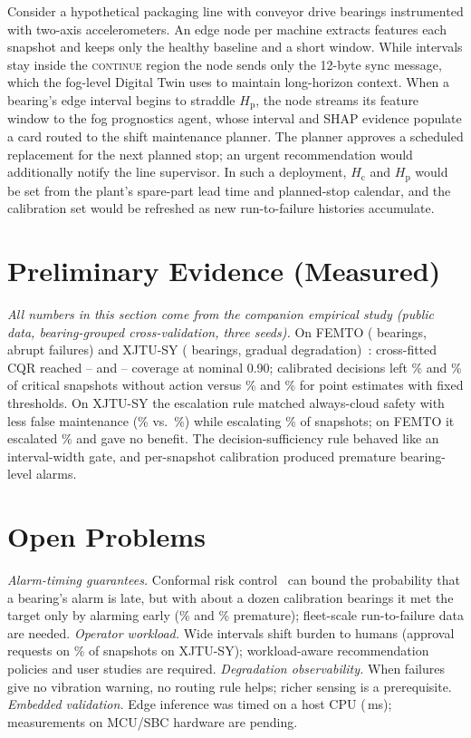 \documentclass[conference]{IEEEtran}
\newcommand{\Hc}{H_{\mathrm{c}}}
\newcommand{\Hp}{H_{\mathrm{p}}}
\begin{document}
Consider a hypothetical packaging line with conveyor drive bearings instrumented with two-axis accelerometers. An edge node per machine extracts features each snapshot and keeps only the healthy baseline and a short window. While intervals stay inside the \textsc{continue} region the node sends only the 12-byte sync message, which the fog-level Digital Twin uses to maintain long-horizon context. When a bearing's edge interval begins to straddle $\Hp$, the node streams its feature window to the fog prognostics agent, whose interval and SHAP evidence populate a card routed to the shift maintenance planner. The planner approves a scheduled replacement for the next planned stop; an urgent recommendation would additionally notify the line supervisor. In such a deployment, $\Hc$ and $\Hp$ would be set from the plant's spare-part lead time and planned-stop calendar, and the calibration set would be refreshed as new run-to-failure histories accumulate.

\section{Preliminary Evidence (Measured)}
\emph{All numbers in this section come from the companion empirical study (public data, bearing-grouped cross-validation, three seeds).}
On FEMTO (\feNBearings{} bearings, abrupt failures) and XJTU-SY (\xjNBearings{} bearings, gradual degradation)~\cite{nectoux2012pronostia,wang2020xjtu}: cross-fitted CQR reached \fePicpEdge--\fePicpCloud{} and \xjPicpCloud--\xjPicpEdge{} coverage at nominal 0.90; calibrated decisions left \feUnsafeHera\% and \xjUnsafeHera\% of critical snapshots without action versus \feUnsafePoint\% and \xjUnsafePoint\% for point estimates with fixed thresholds. On XJTU-SY the escalation rule matched always-cloud safety with less false maintenance (\xjFmHera\% vs.\ \xjFmCloud\%) while escalating \xjEscHera\% of snapshots; on FEMTO it escalated \feEscHera\% and gave no benefit. The decision-sufficiency rule behaved like an interval-width gate, and per-snapshot calibration produced premature bearing-level alarms.

\section{Open Problems}
\textit{Alarm-timing guarantees.} Conformal risk control~\cite{angelopoulos2024crc} can bound the probability that a bearing's alarm is late, but with about a dozen calibration bearings it met the target only by alarming early (\fePremCrcTen\% and \xjPremCrcTen\% premature); fleet-scale run-to-failure data are needed.
\textit{Operator workload.} Wide intervals shift burden to humans (approval requests on \xjApprHera\% of snapshots on XJTU-SY); workload-aware recommendation policies and user studies are required.
\textit{Degradation observability.} When failures give no vibration warning, no routing rule helps; richer sensing is a prerequisite.
\textit{Embedded validation.} Edge inference was timed on a host CPU (\feEdgeLat\,ms); measurements on MCU/SBC hardware are pending.
\end{document}
